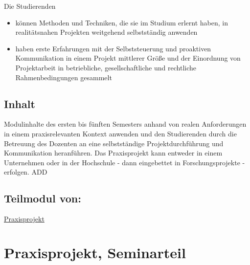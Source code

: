 Die Studierenden

\begin{itemize}
\tightlist
\item
  können Methoden und Techniken, die sie im Studium erlernt haben, in
  realitätsnahen Projekten weitgehend selbstständig anwenden
\item
  haben erste Erfahrungen mit der Selbststeuerung und proaktiven
  Kommunikation in einem Projekt mittlerer Größe und der Einordnung von
  Projektarbeit in betriebliche, gesellschaftliche und rechtliche
  Rahmenbedingungen gesammelt
\end{itemize}

\hypertarget{inhaltpathlabelmi-2017modulbeschreibungen-bachelorba_praxisprojektarbeit}{%
\section*{Inhalt\label{/mi-2017/modulbeschreibungen-bachelor/BA_Praxisprojektarbeit}}\label{inhaltpathlabelmi-2017modulbeschreibungen-bachelorba_praxisprojektarbeit}}

Modulinhalte des ersten bis fünften Semesters anhand von realen
Anforderungen in einem praxisrelevanten Kontext anwenden und den
Studierenden durch die Betreuung des Dozenten an eine selbstständige
Projektdurchführung und Kommunikation heranführen. Das Praxisprojekt
kann entweder in einem Unternehmen oder in der Hochschule - dann
eingebettet in Forschungsprojekte - erfolgen. ADD

\hypertarget{teilmodul-vonpathlabelmi-2017modulbeschreibungen-bachelorba_praxisprojektarbeit}{%
\section*{Teilmodul
von:\label{/mi-2017/modulbeschreibungen-bachelor/BA_Praxisprojektarbeit}}\label{teilmodul-vonpathlabelmi-2017modulbeschreibungen-bachelorba_praxisprojektarbeit}}

\hyperref[/mi-2017/modulbeschreibungen-bachelor/BA_Praxisprojekt]{Praxisprojekt}

\hypertarget{praxisprojekt-seminarteilpathlabelmi-2017modulbeschreibungen-bachelorba_praxisprojektseminar}{%
\chapter{Praxisprojekt,
Seminarteil\label{/mi-2017/modulbeschreibungen-bachelor/BA_Praxisprojektseminar}}\label{praxisprojekt-seminarteilpathlabelmi-2017modulbeschreibungen-bachelorba_praxisprojektseminar}}

